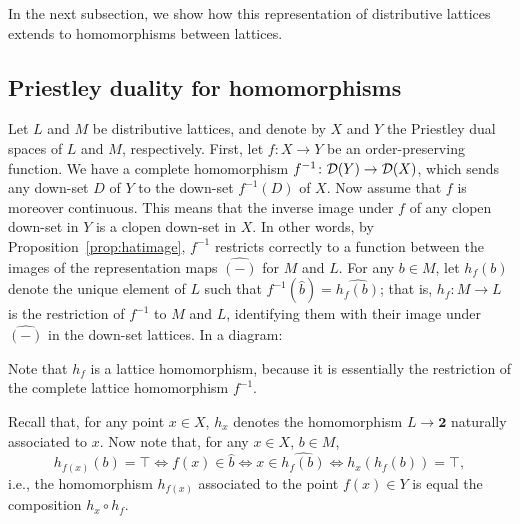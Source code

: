 In the next subsection, we show how this representation of distributive lattices extends to homomorphisms between lattices.%




\subsection*{Priestley duality for homomorphisms}
Let $L$ and $M$ be distributive lattices, and denote by $X$ and $Y$ the Priestley dual spaces of $L$ and $M$, respectively. First, let $f \colon X \to Y$ be an order-preserving function. We have a complete homomorphism $f^{-1} \colon \mathcal{D}(Y) \to \mathcal{D}(X)$, which sends any down-set $D$ of $Y$ to the down-set $f^{-1}(D)$ of $X$. Now assume that $f$ is moreover continuous. This means that the inverse image under $f$ of any clopen down-set in $Y$ is a clopen down-set in $X$. In other words, by Proposition~\ref{prop:hatimage}, $f^{-1}$ restricts correctly to a function between the images of the representation maps $\widehat{(-)}$ for $M$ and $L$. For any $b \in M$, let $h_f(b)$ denote the unique element of $L$ such that $f^{-1}(\widehat{b}) = \widehat{h_f(b)}$; that is, $h_f \colon M \to L$ is the restriction of $f^{-1}$ to $M$ and $L$, identifying them with their image under $\widehat{(-)}$ in the down-set lattices. In a diagram:
\begin{center}
\end{center}
Note that $h_f$ is a lattice homomorphism, because it is essentially the restriction of the complete lattice homomorphism $f^{-1}$.

Recall that, for any point $x \in X$, $h_x$ denotes the homomorphism $L \to \mathbf{2}$ naturally associated to $x$. Now note that, for any $x \in X$, $b \in M$,
\[ h_{f(x)}(b) = \top \iff f(x) \in \widehat{b} \iff x \in \widehat{h_f(b)} \iff h_x(h_f(b)) = \top,\]
i.e., the homomorphism $h_{f(x)}$ associated to the point $f(x) \in Y$ is equal the composition $h_x \circ h_f$.

